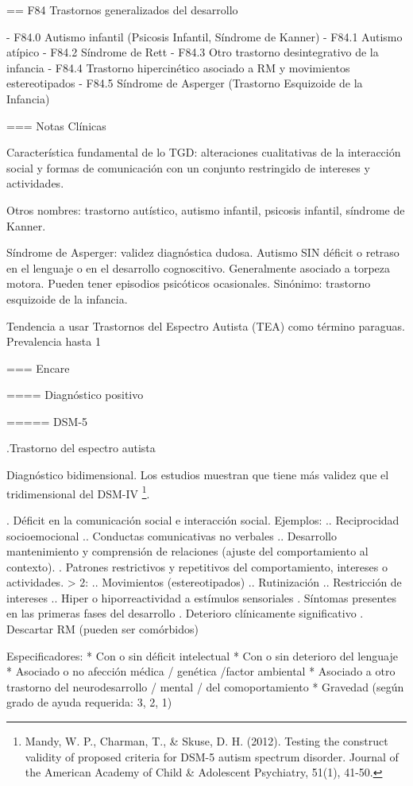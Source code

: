 == F84 Trastornos generalizados del desarrollo

- F84.0 Autismo infantil (Psicosis Infantil, Síndrome de Kanner)
- F84.1 Autismo atípico
- F84.2 Síndrome de Rett
- F84.3 Otro trastorno desintegrativo de la infancia
- F84.4 Trastorno hipercinético asociado a RM y movimientos estereotipados
- F84.5 Síndrome de Asperger (Trastorno Esquizoide de la Infancia)

=== Notas Clínicas

Característica fundamental de lo TGD: alteraciones cualitativas de la interacción social y formas de comunicación con un conjunto restringido de intereses y actividades.

Otros nombres: trastorno autístico, autismo infantil, psicosis infantil, síndrome de Kanner.

Síndrome de Asperger: validez diagnóstica dudosa. Autismo SIN déficit o retraso en el lenguaje o en el desarrollo cognoscitivo. Generalmente asociado a torpeza motora. Pueden tener episodios psicóticos ocasionales. Sinónimo: trastorno esquizoide de la infancia.

Tendencia a usar Trastornos del Espectro Autista (TEA) como término paraguas. Prevalencia hasta 1%

=== Encare

==== Diagnóstico positivo

===== DSM-5

.Trastorno del espectro autista

Diagnóstico bidimensional. Los estudios muestran que tiene más validez que el tridimensional del DSM-IV \footnote{Mandy, W. P., Charman, T., \& Skuse, D. H. (2012). Testing the construct validity of proposed criteria for DSM-5 autism spectrum disorder. Journal of the American Academy of Child \& Adolescent Psychiatry, 51(1), 41-50.}.

. Déficit en la comunicación social e interacción social. Ejemplos:
.. Reciprocidad socioemocional
.. Conductas comunicativas no verbales
.. Desarrollo mantenimiento y comprensión de relaciones (ajuste del comportamiento al contexto).
. Patrones restrictivos y repetitivos del comportamiento, intereses o actividades. > 2:
.. Movimientos (estereotipados)
.. Rutinización
.. Restricción de intereses
.. Hiper o hiporreactividad a estímulos sensoriales
. Síntomas presentes en las primeras fases del desarrollo
. Deterioro clínicamente significativo
. Descartar RM (pueden ser comórbidos)

Especificadores:
* Con o sin déficit intelectual
* Con o sin deterioro del lenguaje
* Asociado o no afección médica / genética /factor ambiental
* Asociado a otro trastorno del neurodesarrollo / mental / del comoportamiento
* Gravedad (según grado de ayuda requerida: 3, 2, 1)

